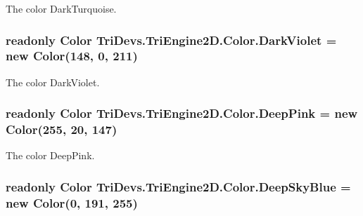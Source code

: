 The color Dark\-Turquoise. 

\hypertarget{struct_tri_devs_1_1_tri_engine2_d_1_1_color_adc1bf5d5f4bf38c0d47e94793ceb102f}{
\subsubsection[{Dark\-Violet}]{\setlength{\rightskip}{0pt plus 5cm}readonly {\bf Color} Tri\-Devs.\-Tri\-Engine2\-D.\-Color.\-Dark\-Violet = new {\bf Color}(148, 0, 211)\hspace{0.3cm}{\ttfamily [static]}}}\label{struct_tri_devs_1_1_tri_engine2_d_1_1_color_adc1bf5d5f4bf38c0d47e94793ceb102f}


The color Dark\-Violet. 

\hypertarget{struct_tri_devs_1_1_tri_engine2_d_1_1_color_af145cae7380f9f0362104685127ef3a4}{
\subsubsection[{Deep\-Pink}]{\setlength{\rightskip}{0pt plus 5cm}readonly {\bf Color} Tri\-Devs.\-Tri\-Engine2\-D.\-Color.\-Deep\-Pink = new {\bf Color}(255, 20, 147)\hspace{0.3cm}{\ttfamily [static]}}}\label{struct_tri_devs_1_1_tri_engine2_d_1_1_color_af145cae7380f9f0362104685127ef3a4}


The color Deep\-Pink. 

\hypertarget{struct_tri_devs_1_1_tri_engine2_d_1_1_color_aadea9ea0dce4b3267aa65f7c0ce1e1a1}{
\subsubsection[{Deep\-Sky\-Blue}]{\setlength{\rightskip}{0pt plus 5cm}readonly {\bf Color} Tri\-Devs.\-Tri\-Engine2\-D.\-Color.\-Deep\-Sky\-Blue = new {\bf Color}(0, 191, 255)\hspace{0.3cm}{\ttfamily [static]}}}\label{struct_tri_devs_1_1_tri_engine2_d_1_1_color_aadea9ea0dce4b3267aa65f7c0ce1e1a1}


